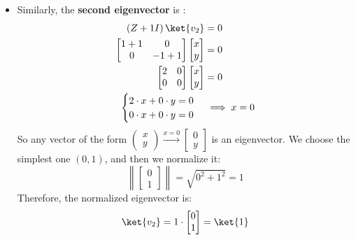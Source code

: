 \begin{itemize}
    \item Similarly, the \textbf{second eigenvector}  is :
    \begin{align*}
        \left(Z + 1 I\right)\ket{v_2} &= 0 \\
        \begin{bmatrix}
            1 + 1 & 0 \\
            0 & -1 + 1
        \end{bmatrix}
        \begin{bmatrix}
            x \\
            y
        \end{bmatrix} &= 0 \\
        \begin{bmatrix}
            2 & 0 \\
            0 & 0
        \end{bmatrix}
        \begin{bmatrix}
            x \\
            y
        \end{bmatrix} &= 0 \\
        \begin{cases}
            2 \cdot x + 0 \cdot y = 0 \\
            0 \cdot x + 0 \cdot y = 0
        \end{cases} &\implies
        x = 0
    \end{align*}
    So any vector of the form $\begin{pmatrix}
        x \\
        y
    \end{pmatrix} \xrightarrow{x=0} \begin{bmatrix}
        0 \\
        y
    \end{bmatrix}$ is an eigenvector. We choose the simplest one $\left(0, 1\right)$, and then we normalize it:
    \begin{equation*}
        \left\|\begin{bmatrix}
            0 \\
            1
        \end{bmatrix}\right\| = \sqrt{0^2 + 1^2} = 1
    \end{equation*}
    Therefore, the normalized eigenvector is:
    \begin{equation*}
        \ket{v_2} = 1 \cdot \begin{bmatrix}
            0 \\
            1
        \end{bmatrix} = \ket{1}
    \end{equation*}
\end{itemize}

